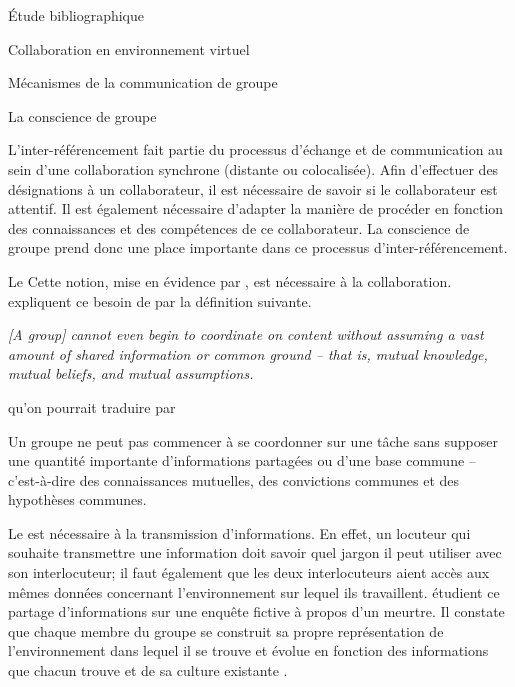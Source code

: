 \documentclass[myfrancais,ngerman,english,frenchb]{mythesis}
\begin{document}
\begin{mychapter}{Étude bibliographique}
\begin{mysection}{Collaboration en environnement virtuel}
\begin{mysubsection}{Mécanismes de la communication de groupe}
\begin{mysubsubsection}{La conscience de groupe}
					\begin{myfigure}
					\end{myfigure}

					L'inter-référencement fait partie du processus d'échange et de communication au sein d'une collaboration synchrone (distante ou colocalisée).
					Afin d'effectuer des désignations à un collaborateur, il est nécessaire de savoir si le collaborateur est attentif.
					Il est également nécessaire d'adapter la manière de procéder en fonction des connaissances et des compétences de ce collaborateur.
					La conscience de groupe prend donc une place importante dans ce processus d'inter-référencement.
				\end{mysubsubsection}
				\begin{mysubsubsection}{Le \mygrounding}
					Cette notion, mise en évidence par , est nécessaire à la collaboration.
					 expliquent ce besoin de \mygrounding par la définition suivante.
					\begin{myquote}[english]
						\it [A group] cannot even begin to coordinate on content without assuming a vast amount of shared information or common ground -- that is, mutual knowledge, mutual beliefs, and mutual assumptions.
					\end{myquote}
					qu'on pourrait traduire par
					\begin{myquote}[frenchb]
						Un groupe ne peut pas commencer à se coordonner sur une tâche sans supposer une quantité importante d'informations partagées ou d'une base commune -- c'est-à-dire des connaissances mutuelles, des convictions communes et des hypothèses communes.
					\end{myquote}

					Le \mygrounding est nécessaire à la transmission d'informations.
					En effet, un locuteur qui souhaite transmettre une information doit savoir quel jargon il peut utiliser avec son interlocuteur; il faut également que les deux interlocuteurs aient accès aux mêmes données concernant l'environnement sur lequel ils travaillent.
					 étudient ce partage d'informations sur une enquête fictive à propos d'un meurtre.
					Il constate que chaque membre du groupe se construit sa propre représentation de l'environnement dans lequel il se trouve et évolue en fonction des informations que chacun trouve et de sa culture existante .


\end{mysubsubsection}
\end{mysubsection}
\end{mysection}
\end{mychapter}
\end{document}

